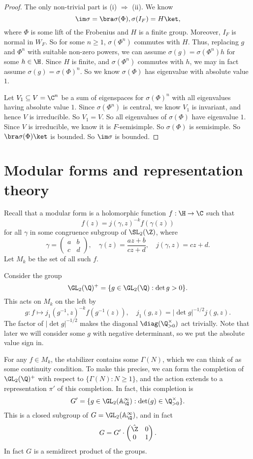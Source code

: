 \documentclass[a4paper]{article}
\newcommand\A{\mathbb{A}}
\begin{document}
\begin{proof}
  The only non-trivial part is (i) $\Rightarrow$ (ii). We know
  \[
    \im \sigma = \bra \sigma(\Phi), \sigma(I_F) = H\ket,
  \]
  where $\Phi$ is some lift of the Frobenius and $H$ is a finite group. Moreover, $I_F$ is normal in $W_F$. So for some $n \geq 1$, $\sigma(\Phi^n)$ commutes with $H$. Thus, replacing $g$ and $\Phi^n$ with suitable non-zero powers, we can assume $\sigma(g) = \sigma(\Phi^n) h$ for some $h \in \H$. Since $H$ is finite, and $\sigma(\Phi^n)$ commutes with $h$, we may in fact assume $\sigma(g) = \sigma(\Phi)^n$. So we know $\sigma(\Phi)$ has eigenvalue with absolute value $1$.

  Let $V_1 \subseteq V = \C^n$ be a sum of eigenspaces for $\sigma(\Phi)^n$ with all eigenvalues having absolute value $1$. Since $\sigma(\Phi^n)$ is central, we know $V_1$ is invariant, and hence $V$ is irreducible. So $V_1 = V$. So all eigenvalues of $\sigma(\Phi)$ have eigenvalue $1$. Since $V$ is irreducible, we know it is $F$-semisimple. So $\sigma(\Phi)$ is semisimple. So $\bra \sigma(\Phi)\ket$ is bounded. So $\im \sigma$ is bounded.
\end{proof}

\section{Modular forms and representation theory}
Recall that a modular form is a holomorphic function $f: \H \to \C$ such that
\[
  f(z) = j(\gamma, z)^{-k} f(\gamma (z))
\]
for all $\gamma$ in some congruence subgroup of $\SL_2(\Z)$, where
\[
  \gamma =
  \begin{pmatrix}
    a & b\\
    c & d
  \end{pmatrix},\quad \gamma(z) = \frac{az + b}{cz + d},\quad j(\gamma, z) = cz + d.
\]
Let $M_k$ be the set of all such $f$.

Consider the group
\[
  \GL_2(\Q)^+ = \{g \in \GL_2(\Q) : \det g > 0\}.
\]
This acts on $M_k$ on the left by
\[
  g: f \mapsto j_1(g^{-1}, z)^{-k} f(g^{-1}(z)),\quad j_1(g, z) = |\det g|^{-1/2} j(g, z).
\]
The factor of $|\det g|^{-1/2}$ makes the diagonal $\diag(\Q^\times_{> 0})$ act trivially. Note that later we will consider some $g$ with negative determinant, so we put the absolute value sign in.

For any $f \in M_k$, the stabilizer contains some $\Gamma(N)$, which we can think of as some continuity condition. To make this precise, we can form the completion of $\GL_2(\Q)^+$ with respect to $\{\Gamma(N) : N \geq 1\}$, and the action extends to a representation $\pi'$ of this completion. In fact, this completion is
\[
  G' = \{g \in \GL_2(\A^\infty_{\Q}) : \det (g) \in \Q^{\times}_{> 0}\}.
\]
This is a closed subgroup of $G = \GL_2(\A^\infty_\Q)$, and in fact
\[
  G = G' \cdot
  \begin{pmatrix}
    \hat{\Z} & 0\\
    0 & 1
  \end{pmatrix}.
\]
In fact $G$ is a semidirect product of the groups.
\end{document}
